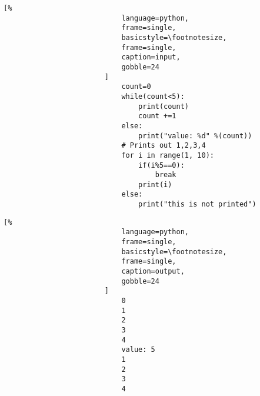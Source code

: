 \documentclass[crop=false,class=book,oneside]{standalone}
\begin{document}
                    \begin{minipage}[t]{.48\textwidth}
                        \centering
                        \begin{lstlisting}[%
                            language=python,
                            frame=single,
                            basicstyle=\footnotesize,
                            frame=single,
                            caption=input,
                            gobble=24
                        ]
                            count=0
                            while(count<5):
                                print(count)
                                count +=1
                            else:
                                print("value: %d" %(count))
                            # Prints out 1,2,3,4
                            for i in range(1, 10):
                                if(i%5==0):
                                    break
                                print(i)
                            else:
                                print("this is not printed")
                        \end{lstlisting}
                    \end{minipage}\hfill
                    \begin{minipage}[t]{.48\textwidth}
                        \centering
                        \begin{lstlisting}[%
                            language=python,
                            frame=single,
                            basicstyle=\footnotesize,
                            frame=single,
                            caption=output,
                            gobble=24
                        ]
                            0
                            1
                            2
                            3
                            4
                            value: 5
                            1
                            2
                            3
                            4
                        \end{lstlisting}
                    \end{minipage}
\end{document}
